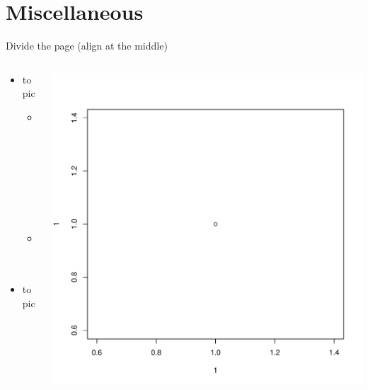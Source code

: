 \documentclass[table]{beamer}
\begin{document}
\section{Miscellaneous}
\label{sec:org18aa711}

\begin{frame}[label={sec:orgc3fb514}]{Divide the page (align at the middle)}
\begin{columns}
\begin{column}{0.45\columnwidth}
\begin{itemize}
\item topic
\begin{itemize}
\item subtopic
\item sub
\end{itemize}
\item topic
\end{itemize}
\end{column}

\begin{column}{0.45\columnwidth}
\begin{center}
\includegraphics[width=.9\linewidth]{./figures/myplot.pdf}
\end{center}
\end{column}
\end{columns}
\end{frame}
\end{document}
